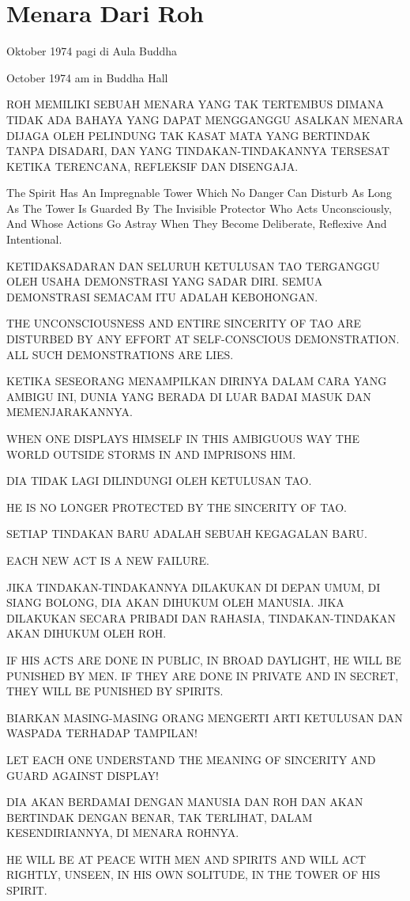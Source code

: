 \chapter{Menara Dari Roh}

 Oktober 1974 pagi di Aula Buddha

 October 1974 am in Buddha Hall

\bahasa
ROH MEMILIKI SEBUAH MENARA YANG TAK TERTEMBUS DIMANA TIDAK ADA BAHAYA YANG DAPAT MENGGANGGU ASALKAN MENARA DIJAGA OLEH PELINDUNG TAK KASAT MATA YANG BERTINDAK TANPA DISADARI, DAN YANG TINDAKAN-TINDAKANNYA TERSESAT KETIKA TERENCANA, REFLEKSIF DAN DISENGAJA.

\english
The Spirit Has An Impregnable Tower Which No Danger Can Disturb As Long As The Tower Is Guarded By The Invisible Protector Who Acts Unconsciously, And Whose Actions Go Astray When They Become Deliberate, Reflexive And Intentional.

\bahasa
KETIDAKSADARAN DAN SELURUH KETULUSAN TAO TERGANGGU OLEH USAHA DEMONSTRASI YANG SADAR DIRI. SEMUA DEMONSTRASI SEMACAM ITU ADALAH KEBOHONGAN.

\english
THE UNCONSCIOUSNESS AND ENTIRE SINCERITY OF TAO ARE DISTURBED BY ANY EFFORT AT SELF-CONSCIOUS DEMONSTRATION. ALL SUCH DEMONSTRATIONS ARE LIES.

\bahasa
KETIKA SESEORANG MENAMPILKAN DIRINYA DALAM CARA YANG AMBIGU INI, DUNIA YANG BERADA DI LUAR BADAI MASUK DAN MEMENJARAKANNYA.

\english
WHEN ONE DISPLAYS HIMSELF IN THIS AMBIGUOUS WAY THE WORLD OUTSIDE STORMS IN AND IMPRISONS HIM.

\bahasa
DIA TIDAK LAGI DILINDUNGI OLEH KETULUSAN TAO.

\english
HE IS NO LONGER PROTECTED BY THE SINCERITY OF TAO.

\bahasa
SETIAP TINDAKAN BARU ADALAH SEBUAH KEGAGALAN BARU.

\english
EACH NEW ACT IS A NEW FAILURE.

\bahasa
JIKA TINDAKAN-TINDAKANNYA DILAKUKAN DI DEPAN UMUM, DI SIANG BOLONG, DIA AKAN DIHUKUM OLEH MANUSIA. JIKA DILAKUKAN SECARA PRIBADI DAN RAHASIA, TINDAKAN-TINDAKAN AKAN DIHUKUM OLEH ROH.

\english
IF HIS ACTS ARE DONE IN PUBLIC, IN BROAD DAYLIGHT, HE WILL BE PUNISHED BY MEN. IF THEY ARE DONE IN PRIVATE AND IN SECRET, THEY WILL BE PUNISHED BY SPIRITS.

\bahasa
BIARKAN MASING-MASING ORANG MENGERTI ARTI KETULUSAN DAN WASPADA TERHADAP TAMPILAN!

\english
LET EACH ONE UNDERSTAND THE MEANING OF SINCERITY AND GUARD AGAINST DISPLAY!

\bahasa
DIA AKAN BERDAMAI DENGAN MANUSIA DAN ROH DAN AKAN BERTINDAK DENGAN BENAR, TAK TERLIHAT, DALAM KESENDIRIANNYA, DI MENARA ROHNYA.

\english
HE WILL BE AT PEACE WITH MEN AND SPIRITS AND WILL ACT RIGHTLY, UNSEEN, IN HIS OWN SOLITUDE, IN THE TOWER OF HIS SPIRIT.
